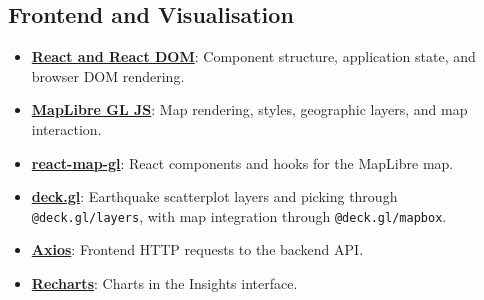 \documentclass[12pt]{article}
\begin{document}
\subsection*{Frontend and Visualisation}
\begin{itemize}
    \item \href{https://react.dev/}{\textbf{React and React DOM}}: Component structure, application state, and browser DOM rendering.
    \item \href{https://maplibre.org/maplibre-gl-js/docs/}{\textbf{MapLibre GL JS}}: Map rendering, styles, geographic layers, and map interaction.
    \item \href{https://visgl.github.io/react-map-gl/}{\textbf{react-map-gl}}: React components and hooks for the MapLibre map.
    \item \href{https://deck.gl/}{\textbf{deck.gl}}: Earthquake scatterplot layers and picking through \texttt{@deck.gl/layers}, with map integration through \texttt{@deck.gl/mapbox}.
    \item \href{https://axios-http.com/}{\textbf{Axios}}: Frontend HTTP requests to the backend API.
    \item \href{https://recharts.org/}{\textbf{Recharts}}: Charts in the Insights interface.
\end{itemize}
\end{document}
